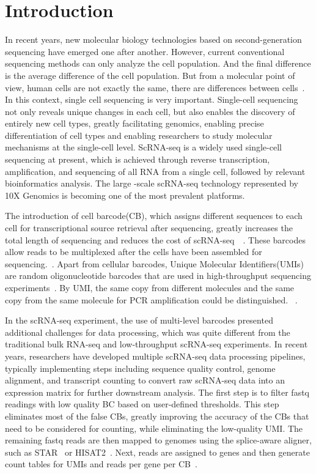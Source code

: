\documentclass[runningheads]{llncs}
\begin{document}
\section{Introduction}
In recent years, new molecular biology technologies based on second-generation sequencing have emerged one after another.
However, current conventional sequencing methods can only analyze the cell population.
And the final difference is the average difference of the cell population.
But from a molecular point of view, human cells are not exactly the same, there are differences between cells~\cite{Papalexi2018SinglecellRS}.
In this context, single cell sequencing is very important.
Single-cell sequencing not only reveals unique changes in each cell, but also enables the discovery of entirely new cell types, greatly facilitating genomics, enabling precise differentiation of cell types and enabling researchers to study molecular mechanisms at the single-cell level.
ScRNA-seq is a widely used single-cell sequencing at present, which is achieved through reverse transcription, amplification, and sequencing of all RNA from a single cell, followed by relevant bioinformatics analysis. 
The large
         -scale 
                scRNA-seq technology represented by 10X Genomics is becoming one of the most prevalent platforms.

The introduction of cell barcode(CB), which assigns different sequences to each cell for transcriptional source retrieval after sequencing, greatly increases the total length of sequencing and reduces the cost of scRNA-seq~\cite{Macosko2015HighlyPG}~\cite{Klein2015DropletBF}.
These barcodes allow reads to be multiplexed after the cells have been assembled for sequencing.~\cite{tian2018scPipe}.
Apart from cellular barcodes, Unique Molecular Identifiers(UMIs) are random oligonucleotide barcodes that are used in high-throughput sequencing experiments\cite{Kivioja2012Counting}~\cite{camara2017Methods}.
By UMI, the same copy from different molecules and the same copy from the same molecule for PCR amplification could be distinguished. ~\cite{smith2017UMI}.

In the scRNA-seq experiment, the use of multi-level barcodes presented additional challenges for data processing, which was quite different from the traditional bulk RNA-seq and low-throughput scRNA-seq experiments.
In recent years, researchers have developed multiple scRNA-seq data processing pipelines, typically implementing steps including sequence quality control, genome alignment, and transcript counting to convert raw scRNA-seq data into an expression matrix for further downstream analysis.
The first step is to filter fastq readings with low quality BC based on user-defined thresholds.
This step eliminates most of the false CBs, greatly improving the accuracy of the CBs that need to be considered for counting, while eliminating the low-quality UMI.
The remaining fastq reads are then mapped to genomes using the splice-aware aligner, such as STAR~\cite{dobin2012RNA} or HISAT2~\cite{kim2015hisat}.
Next, reads are assigned to genes and then generate count tables for UMIs and reads per gene per CB~\cite{swati0zUMIs}.
\end{document}
